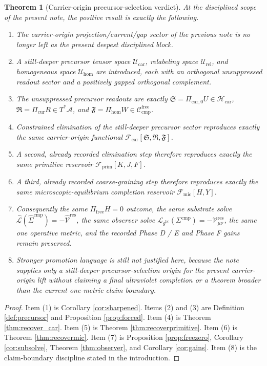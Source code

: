 \documentclass[11pt]{article}
\newcommand{\Sub}{\mathcal A}
\newcommand{\ObserverMetric}{g^{\mathrm{br}}}
\newcommand{\CompShift}{\Sigma^{\mathrm{cmp}}}
\newcommand{\CompLift}{\widehat\Sigma^{\mathrm{cmp}}}
\newcommand{\ResidualCore}{\mathcal V_{\mu\nu}^{\mathrm{res}}}
\newcommand{\ResidualLift}{\widehat{\mathcal V}^{\mathrm{res}}}
\newcommand{\SubReducedEin}{\widehat{\mathcal L}}
\newcommand{\GaugeAux}{Y}
\newcommand{\ReducedEin}{\mathcal L_{\ObserverMetric}}
\newcommand{\CompFree}{\mathscr C_{\mathrm{cmp}}^{\mathrm{free}}}
\newcommand{\MicFunctional}{\mathscr F_{\mathrm{mic}}}
\newcommand{\PrimFunctional}{\mathscr F_{\mathrm{prim}}}
\newcommand{\CarrierFunctional}{\mathscr F_{\mathrm{car}}}
\newcommand{\PrimStrain}{K}
\newcommand{\PrimNeutral}{J}
\newcommand{\PrimFree}{F}
\newcommand{\CarrierClass}{\mathscr H_{\mathrm{car}}}
\newcommand{\CarrierSeed}{\mathfrak S}
\newcommand{\RelabelSeed}{\mathfrak R}
\newcommand{\FreeSeed}{\mathfrak F}
\newcommand{\PreTensorClass}{\mathscr U_{\mathrm{car}}}
\newcommand{\PreRelabelClass}{\mathscr U_{\mathrm{rel}}}
\newcommand{\PreFreeClass}{\mathscr U_{\mathrm{hom}}}
\newcommand{\PreTensor}{U}
\newcommand{\PreRelabel}{R}
\newcommand{\PreFree}{W}
\newcommand{\PreCarProj}{\Pi_{\mathrm{car},0}}
\newcommand{\CurrentProj}{\Pi_{\mathrm{cur}}}
\newcommand{\FreeReadProj}{\Pi_{\mathrm{hom}}}
\newtheorem{theorem}{Theorem}
\begin{document}
\begin{theorem}[Carrier-origin precursor-selection verdict]
\label{thm:verdict}
At the disciplined scope of the present note, the positive result is exactly the following.
\begin{enumerate}
    \item The carrier-origin projection/current/gap sector of the previous note is no longer left as the present deepest disciplined block.
    \item A still-deeper precursor tensor space \(\PreTensorClass\), relabeling space \(\PreRelabelClass\), and homogeneous space \(\PreFreeClass\) are introduced, each with an orthogonal unsuppressed readout sector and a positively gapped orthogonal complement.
    \item The unsuppressed precursor readouts are exactly \(\CarrierSeed=\PreCarProj\PreTensor\in\CarrierClass\), \(\RelabelSeed=\CurrentProj\PreRelabel\in T^*\Sub\), and \(\FreeSeed=\FreeReadProj\PreFree\in\CompFree\).
    \item Constrained elimination of the still-deeper precursor sector reproduces exactly the same carrier-origin functional \(\CarrierFunctional[\CarrierSeed,\RelabelSeed,\FreeSeed]\).
    \item A second, already recorded elimination step therefore reproduces exactly the same primitive reservoir \(\PrimFunctional[\PrimStrain,\PrimNeutral,\PrimFree]\).
    \item A third, already recorded coarse-graining step therefore reproduces exactly the same microscopic-equilibrium completion reservoir \(\MicFunctional[H,\GaugeAux]\).
    \item Consequently the same \(\Pi_{\mathrm{free}}H=0\) outcome, the same substrate solve \(\SubReducedEin(\CompLift)=-\ResidualLift\), the same observer solve \(\ReducedEin(\CompShift)=-\ResidualCore\), the same one operative metric, and the recorded Phase D / E and Phase F gains remain preserved.
    \item Stronger promotion language is still not justified here, because the note supplies only a still-deeper precursor-selection origin for the present carrier-origin lift without claiming a final ultraviolet completion or a theorem broader than the current one-metric claim boundary.
\end{enumerate}
\end{theorem}

\begin{proof}
Item (1) is Corollary \ref{cor:sharpened}. Items (2) and (3) are Definition \ref{def:precursor} and Proposition \ref{prop:forced}. Item (4) is Theorem \ref{thm:recover_car}. Item (5) is Theorem \ref{thm:recoverprimitive}. Item (6) is Theorem \ref{thm:recovermic}. Item (7) is Proposition \ref{prop:freezero}, Corollary \ref{cor:subsolve}, Theorem \ref{thm:observer}, and Corollary \ref{cor:gains}. Item (8) is the claim-boundary discipline stated in the introduction.
\end{proof}
\end{document}
